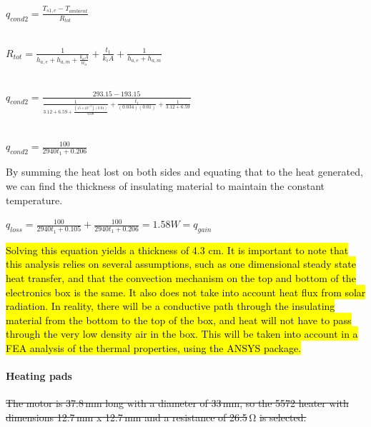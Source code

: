 \begin{center}
 $q_{cond2} = \frac{T_{s1,e}-T_{ambient}}{R_{tot}} $\\
 
 \ 
 
 $R_{tot} = \frac{1}{h_{a,e}+h_{a,m}+\frac{k_{a}A}{w_{a}}} + \frac{t_{1}}{k_{i}A} + \frac{1}{h_{a,e}+h_{a,m}}  $\\
 
 \
 \ 
 
 $q_{cond2} = \frac{293.15 - 193.15}{\frac{1}{3.12+6.59+\frac{(15\times10^{-3})(0.01)}{0.08}} + \frac{t_{1}}{(0.034)(0.01)} + \frac{1}{3.12+6.59}} $\\
 
 \  
 \ 
 
 $q_{cond2} = \frac{100}{2940t_{1}+0.206} $\\
 
\end{center}

By summing the heat lost on both sides and equating that to the heat generated, we can find the thickness of insulating material to maintain the constant temperature. \\

\begin{center}
 $q_{loss} = \frac{100}{2940t_{1}+0.105} + \frac{100}{2940t_{1}+0.206} = 1.58 W = q_{gain} $\\
\end{center}

\hl{Solving this equation yields a thickness of 4.3 cm. It is important to note that this analysis relies on several assumptions, such as one dimensional steady state heat transfer, and that the convection mechanism on the top and bottom of the electronics box is the same. It also does not take into account heat flux from solar radiation. In reality, there will be a conductive path through the insulating material from the bottom to the top of the box, and heat will not have to pass through the very low density air in the box. This will be taken into account in a FEA analysis of the thermal properties, using the ANSYS package.} \\

\paragraph{Heating pads}

\st{The motor is 37.8\,mm long with a diameter of 33\,mm, so the 5572 heater with dimensions 12.7\,mm x 12.7\,mm and a resistance of 26.5}\,\si{\ohm} \st{is selected.}\\

